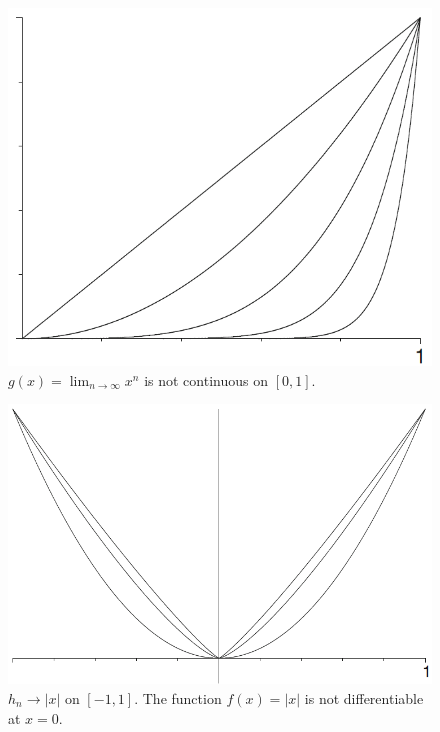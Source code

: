 \documentclass{article}
\begin{document}
           \begin{figure}[ht!]
               \centering
               \includegraphics[width=0.6\linewidth]{figs/exp6.2.2(ii).png}
               \caption{$g(x)=\lim_{n \to \infty} x^n$ is not continuous on $[0,1]$.}
               \label{6.2.2(ii)}
           \end{figure}
           
           \begin{figure}[ht!]
               \centering
               \includegraphics[width=0.6\linewidth]{figs/exp6.2.2(iii).png}
               \caption{$h_n \to |x|$ on $[-1,1]$. The function $f(x)=|x|$ is not differentiable at $x=0$.}
               \label{6.2.2(iii)}
           \end{figure}
           
\end{document}
